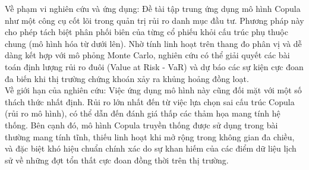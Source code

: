 Về phạm vi nghiên cứu và ứng dụng: Đề tài tập trung ứng dụng mô hình Copula như một công cụ cốt lõi trong quản trị rủi ro danh mục đầu tư. Phương pháp này cho phép tách biệt phân phối biên của từng cổ phiếu khỏi cấu trúc phụ thuộc chung (mô hình hóa từ dưới lên). Nhờ tính linh hoạt trên thang đo phân vị và dễ dàng kết hợp với mô phỏng Monte Carlo, nghiên cứu có thể giải quyết các bài toán định lượng rủi ro đuôi (Value at Risk - VaR) và dự báo các sự kiện cực đoan đa biến khi thị trường chứng khoán xảy ra khủng hoảng đồng loạt.\\
Về giới hạn của nghiên cứu: Việc ứng dụng mô hình này cũng đối mặt với một số thách thức nhất định. Rủi ro lớn nhất đến từ việc lựa chọn sai cấu trúc Copula (rủi ro mô hình), có thể dẫn đến đánh giá thấp các thảm họa mang tính hệ thống. Bên cạnh đó, mô hình Copula truyền thống được sử dụng trong bài thường mang tính tĩnh, thiếu linh hoạt khi mở rộng trong không gian đa chiều, và đặc biệt khó hiệu chuẩn chính xác do sự khan hiếm của các điểm dữ liệu lịch sử về những đợt tổn thất cực đoan đồng thời trên thị trường.

